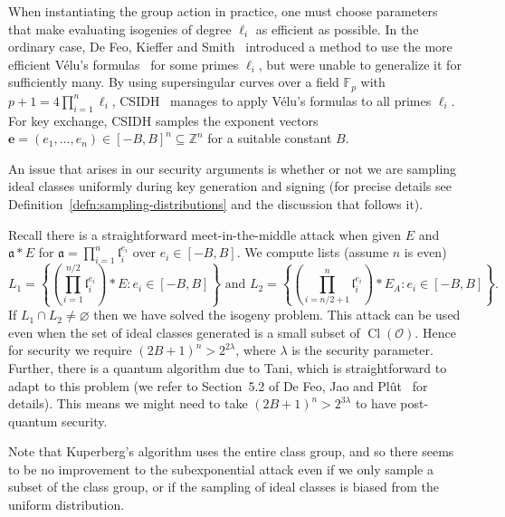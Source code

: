 \documentclass{llncs}
\newcommand{\F}{\mathbb{F}}
\newcommand{\OO}{\mathcal{O}}
\newcommand{\Z}{\mathbb{Z}}
\DeclareMathOperator{\Cl}{Cl}
\renewcommand{\a}{\mathfrak{a}}
\renewcommand{\l}{\mathfrak{l}}
\newcommand{\e}{\mathbf{e}}
\begin{document}
When instantiating the group action in practice, one must choose parameters that make evaluating isogenies of degree $\ell_i$ as efficient as possible.
In the ordinary case, De Feo, Kieffer and Smith~\cite{DFKS18} introduced a method to use the more efficient V\'elu's formulas~\cite{velu71} for some primes $\ell_i$, but were unable to generalize it for sufficiently many.
By using supersingular curves over a field $\F_p$ with $p+1 = 4\prod_{i=1}^n\ell_i$, CSIDH~\cite{CLMPR18} manages to apply V\'elu's formulas to all primes $\ell_i$.
For key exchange, CSIDH samples the exponent vectors $\e = (e_1, \dots, e_n) \in [-B,B]^n \subseteq \Z^n$ for a suitable constant $B$.



An issue that arises in our security arguments is whether or not we are sampling ideal classes uniformly during key generation and signing (for precise details see Definition~\ref{defn:sampling-distributions} and the discussion that follows it).

Recall there is a straightforward meet-in-the-middle attack when given $E$ and $\a * E$ for $\a = \prod_{i=1}^n \l_i^{e_i}$ over $e_i \in [-B, B]$.
We compute lists (assume $n$ is even)
\[
   L_1 = \left\{ \left( \prod_{i=1}^{n/2} \l_i^{e_i} \right) * E : e_i \in [-B,B] \right\} \text{ \ \  and \ \  }
   L_2 = \left\{ \left( \prod_{i=n/2 + 1}^{n} \l_i^{e_i} \right) * E_A : e_i \in [-B,B] \right\}.
\]
If $L_1 \cap L_2 \ne \varnothing$ then we have solved the isogeny problem.
This attack can be used even when the set of ideal classes generated is a small subset of $\Cl( \OO )$.
Hence for security we require $(2B+1)^n > 2^{2 \lambda}$, where $\lambda$ is the security parameter.
Further, there is a quantum algorithm due to Tani, which is straightforward to adapt to this problem (we refer to Section~5.2 of  De Feo, Jao and Pl{\^{u}}t~\cite{FJP14} for details).
This means we might need to take $(2B+1)^n > 2^{3 \lambda}$ to have post-quantum security.

Note that Kuperberg's algorithm uses the entire class group, and so there seems to be no improvement to the subexponential attack even if we only sample a subset of the class group, or if the sampling of ideal classes is biased from the uniform distribution.

\end{document}
